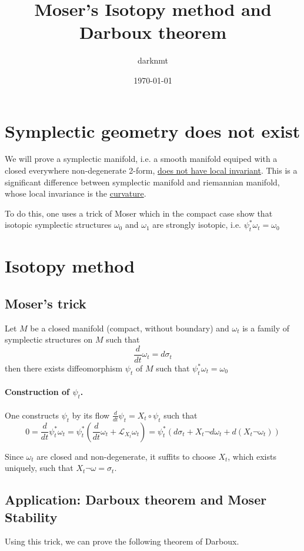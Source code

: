 \documentclass[11pt]{article}
\author{darknmt}
\date{\today}
\title{Moser's Isotopy method and Darboux theorem}
\begin{document}
\maketitle
\tableofcontents


\section{Symplectic geometry does not exist}
\label{sec:org3316df4}
We will prove a symplectic manifold, i.e. a smooth manifold equiped with a closed
everywhere non-degenerate 2-form, \uline{does not have local invariant}. This is a significant
difference between symplectic manifold and riemannian manifold, whose local invariance is
the \uline{curvature}.

To do this, one uses a trick of Moser which in the compact case show that isotopic
symplectic structures \(\omega_0\) and \(\omega_1\) are strongly isotopic, i.e. \(\psi_t^* \omega_t = \omega_0\)
\section{Isotopy method}
\label{sec:orgeb2e2ed}
\subsection{Moser's trick}
\label{sec:org5832dcd}
Let \(M\) be a closed manifold (compact, without boundary) and \(\omega_t\) is a family of
symplectic structures on \(M\) such that
\[
\frac{d}{dt}\omega_t = d\sigma_t
\]
then there exists diffeomorphism \(\psi_t\) of \(M\) such that \(\psi_t^* \omega_t = \omega_0\)


\paragraph{Construction of \(\psi_t\).}
\label{sec:org551d75e}
One constructs \(\psi_t\) by its flow \(\frac{d}{dt}\psi_t = X_t \circ \psi_t\) such that
\[
0 = \frac{d}{dt}\psi_t^*\omega_t = \psi_t^* \left(\frac{d}{dt} \omega_t +
\mathcal{L}_{X_t}\omega_t\right) = \psi_t^* \left( d\sigma_t + X_t \neg d\omega_t + d(X_t
\neg \omega_t) \right)
\]

Since \(\omega_t\) are closed and non-degenerate, it suffits to choose \(X_t\), which exists
uniquely, such that \(X_t \neg \omega = \sigma_t\).

\subsection{Application: Darboux theorem and Moser Stability}
\label{sec:orgb93185e}
Using this trick, we can prove the following theorem of Darboux.
\end{document}
